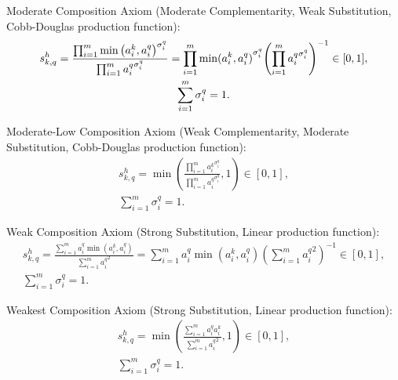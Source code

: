 \documentclass{elsarticle} %
\begin{document}
Moderate Composition Axiom (Moderate Complementarity, Weak Substitution, Cobb-Douglas production function):
\begin{gather*}
    s_{k,q}^{h} = 
    \frac{
        \prod_{i=1}^{m}{
            {\min\left(
                {a_{i}^{k}},
                {a_{i}^{q}}
            \right)} ^ {
            \sigma_{i}^{q}
        }
    }
    }{
        \prod_{i=1}^{m}{
        {a_{i}^{q}} ^ {
            \sigma_{i}^{q}
        }
    }
    }
    =
    \prod_{i=1}^{m}{
            {\min(
                {a_{i}^{k}},
                {a_{i}^{q}}
            )} ^ {
            \sigma_{i}^{q}
        }
    }{\left(
        \prod_{i=1}^{m}{
        {a_{i}^{q}} ^ {
            \sigma_{i}^{q}
        }
    }\right)} ^ {-1}
    \in [0,1]
    ,\\
    \sum_{i=1}^{m}{
        \sigma_{i}^{q}
    } = 1
    .
\end{gather*}

Moderate-Low Composition Axiom (Weak Complementarity, Moderate Substitution, Cobb-Douglas production function):
\begin{gather*}
    s_{k,q}^{h} = 
    \min\left(
        \frac{
        \prod_{i=1}^{m}{
        {a_{i}^{k}} ^ {
            \sigma_{i}^{q}
        }
    }
    }{
        \prod_{i=1}^{m}{
        {a_{i}^{q}} ^ {
            \sigma_{i}^{q}
        }
    }
    }
    , 1
    \right)
    \in [0,1]
    ,\\
    \sum_{i=1}^{m}{
        \sigma_{i}^{q}
    } = 1
    .
\end{gather*}

Weak Composition Axiom (Strong Substitution, Linear production function):
\begin{gather*}
    s_{k,q}^{h} = 
        \frac{
        \sum_{i=1}^{m}{
            a_{i}^{q}
            \min(
                {a_{i}^{k}},           
                {a_{i}^{q}}
            )
    }
    }{
        \sum_{i=1}^{m}{
        {a_{i}^{q}} ^ 2
    }
    } = 
    {\sum_{i=1}^{m}{
            a_{i}^{q}
            \min(
                {a_{i}^{k}},           
                {a_{i}^{q}}
            )
    }}{\left(
        \sum_{i=1}^{m}{
        {a_{i}^{q}} ^ 2
        }
    \right)
    } ^ {-1}
    \in [0,1]
    ,\\
    \sum_{i=1}^{m}{
        \sigma_{i}^{q}
    } = 1
    .
\end{gather*}

Weakest Composition Axiom (Strong Substitution, Linear production function):
\begin{gather*}
    s_{k,q}^{h} = 
    \min\left(
        \frac{
        \sum_{i=1}^{m}{
        {a_{i}^{q}}
        {a_{i}^{k}}
    }
    }{
        \sum_{i=1}^{m}{
        {a_{i}^{q}} ^ 2
    }
    }
    , 1
    \right)
    \in [0,1]
    ,\\
    \sum_{i=1}^{m}{
        \sigma_{i}^{q}
    } = 1
    .
\end{gather*}
\end{document}
